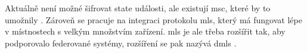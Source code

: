 Aktuálně není možné šifrovat state události, ale existují \gls{msc}, které by to
umožnily \parencite{GitHub-MSC3414}. Zároveň se pracuje na integraci protokolu
\gls{mls}, který má fungovat lépe v místnostech s velkým množstvím zařízení.
\gls{mls} je ale třeba rozšířit tak, aby podporovalo federované systémy,
rozšíření se pak nazývá \gls{dmls} \parencite{AreWeMLSYet}.
